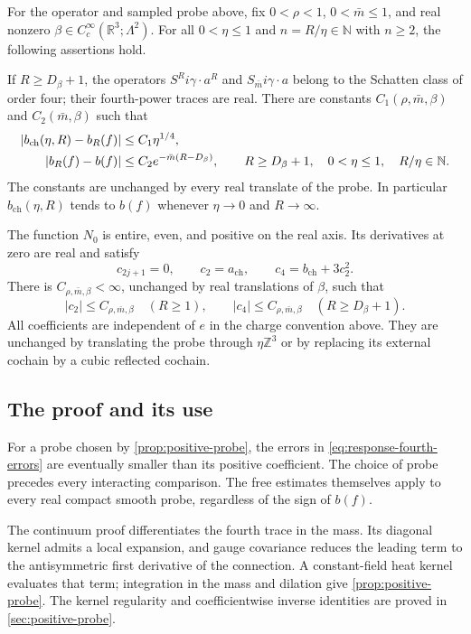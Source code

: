 \documentclass[11pt,letterpaper,reqno]{amsart}
\newcommand{\R}{\mathbb R}
\newcommand{\Z}{\mathbb Z}
\newcommand{\N}{\mathbb N}
\begin{document}
\begin{theorem}\label{prop:response-fourth}
For the operator and sampled probe above, fix
$0<\rho<1$, $0<\bar m\le1$, and real nonzero
$\beta\in C_c^\infty(\R^3;\Lambda^2)$.
For all $0<\eta\le1$ and $n=R/\eta\in\N$ with $n\ge2$,
the following assertions hold.

If $R\ge D_\beta+1$, the operators $S^Ri\gamma\cdot a^R$ and
$S_{\bar m}i\gamma\cdot a$ belong to the Schatten class
of order four; their fourth-power traces are real.
There are constants
$C_1(\rho,\bar m,\beta)$ and $C_2(\bar m,\beta)$ such that
\begin{align}\label{eq:response-fourth-errors}
 |b_{\mathrm{ch}}(\eta,R)-b_R(f)|&\le C_1\eta^{1/4},\notag\\
 |b_R(f)-b(f)|&\le C_2e^{-\bar m(R-D_\beta)},
 \qquad R\ge D_\beta+1,\quad0<\eta\le1,\quad R/\eta\in\N.
\end{align}
The constants are unchanged by every real translate of
the probe. In particular $b_{\mathrm{ch}}(\eta,R)$ tends
to $b(f)$ whenever $\eta\to0$ and $R\to\infty$.

The function $N_0$ is entire, even, and positive on the real axis.
Its derivatives at zero are real and satisfy
\[
 c_{2j+1}=0,\qquad c_2=a_{\mathrm{ch}},\qquad
 c_4=b_{\mathrm{ch}}+3c_2^2 .
\]
There is $C_{\rho,\bar m,\beta}<\infty$, unchanged by real
translations of $\beta$, such that
\[
 |c_2|\le C_{\rho,\bar m,\beta}\quad(R\ge1),\qquad
 |c_4|\le C_{\rho,\bar m,\beta}\quad(R\ge D_\beta+1).
\]
All coefficients are independent of $e$ in the charge convention
above. They are unchanged by translating the probe through
$\eta\Z^3$ or by replacing its external cochain by a cubic reflected
cochain.
\end{theorem}


\subsection{The proof and its use}

For a probe chosen by \cref{prop:positive-probe}, the errors in
\eqref{eq:response-fourth-errors} are eventually smaller than its
positive coefficient. The choice of probe precedes every
interacting comparison. The free estimates themselves apply to
every real compact smooth probe, regardless of the sign of $b(f)$.

The continuum proof differentiates the fourth trace in the mass.
Its diagonal kernel admits a local expansion, and gauge covariance
reduces the leading term to the antisymmetric first derivative of
the connection. A constant-field heat kernel evaluates that term;
integration in the mass and dilation give \cref{prop:positive-probe}.
The kernel regularity and coefficientwise inverse identities are
proved in \cref{sec:positive-probe}.
\end{document}
